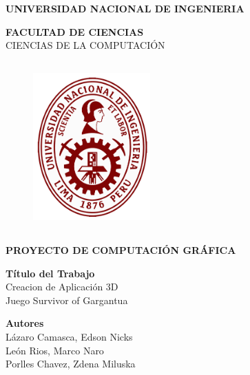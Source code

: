 \documentclass[a4paper]{article}
\begin{document}
\begin{titlepage}
\begin{center}
\vspace*{-0.4in}

{\fontsize{12}{30}\bf \selectfont UNIVERSIDAD NACIONAL DE INGENIERIA\\}

{\fontsize{12}{40}\bf \selectfont FACULTAD DE CIENCIAS\\}
\vspace*{0.15in} CIENCIAS DE LA COMPUTACI\'ON\\
\vspace*{0.2in}
\begin{figure}[htb]
\begin{center}
\includegraphics[width=4.5cm,height=6.5cm]{UNI.png}
\end{center}
\end{figure}
\begin{Large}
\textbf{PROYECTO DE COMPUTACI\'ON GRÁFICA\\}
\end{Large}
\vspace*{0.2in}

\begin{large}
{\bf T\'itulo del Trabajo\\}
\vspace*{0.1in}
{\fontsize{12}{13}\selectfont 
Creacion de Aplicación 3D\\ Juego Survivor of Gargantua\\}
\end{large}
\vspace*{0.3in}

\begin{large}
{\bf Autores} 
\vspace*{0.1in}
\\L\'azaro Camasca, Edson Nicks
\\León Rios, Marco Naro
\\Porlles Chavez, Zdena Miluska


\end{large}
\end{center}
\end{titlepage}
\end{document}
